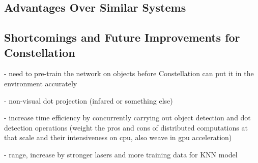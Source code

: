 \subsection{Advantages Over Similar Systems}
\subsection{Shortcomings and Future Improvements for Constellation}
- need to pre-train the network on objects before Constellation can put it in the environment accurately

- non-visual dot projection (infared or something else)

- increase time efficiency by concurrently carrying out object detection and dot detection operations (weight the pros and cons of distributed computations at that scale and their intensiveness on cpu, also weave in gpu acceleration)

- range, increase by stronger lasers and more training data for KNN model